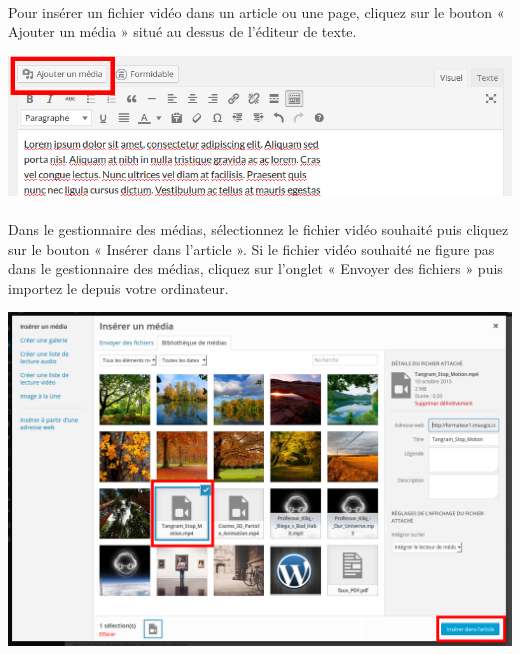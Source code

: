 \documentclass[10pt,a4paper]{article}
\begin{document}
\paragraph{}Pour insérer un fichier vidéo dans un article ou une page, cliquez sur le bouton « Ajouter un média » situé au dessus de l'éditeur de texte.
\begin{center}
\includegraphics[scale=0.3]{img/0102.png}
\end{center}
\paragraph{}Dans le gestionnaire des médias, sélectionnez le fichier vidéo souhaité puis cliquez sur le bouton « Insérer dans l'article ». Si le fichier vidéo souhaité ne figure pas dans le gestionnaire des médias, cliquez sur l'onglet « Envoyer des fichiers » puis importez le depuis votre ordinateur.
\begin{center}
\includegraphics[scale=0.25]{img/0126.png}
\end{center}
\end{document}
